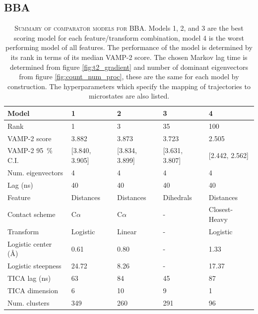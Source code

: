 \documentclass{article}
\begin{document}
\clearpage
\subsection{BBA}

\begin{table}[h]
    \centering
    \begin{tabular}{lllll}
    \toprule
    Model &               1 &               2 &               3 &               4 \\
    \midrule
    Rank                             &               1 &               3 &              35 &             100 \\
    VAMP-2 score                     &           3.882 &           3.873 &           3.723 &           2.505 \\
    VAMP-2 \SI{95}{\percent} C.I.    &  [3.840, 3.905] &  [3.834, 3.899] &  [3.631, 3.807] &  [2.442, 2.562] \\
    Num. eigenvectors                &               4 &               4 &               4 &               4 \\
    Lag (ns)                         &              40 &              40 &              40 &              40 \\
    Feature                          &       Distances &       Distances &       Dihedrals &       Distances \\
    Contact scheme                   &       C$\alpha$ &       C$\alpha$ &               - &   Closest-Heavy \\
    Transform                        &        Logistic &          Linear &               - &        Logistic \\
    Logistic center (\si{\angstrom}) &            0.61 &            0.80 &               - &            1.33 \\
    Logistic steepness               &           24.72 &            8.26 &               - &           17.37 \\
    TICA lag (ns)                    &              63 &              84 &              45 &              87 \\
    TICA dimension                   &               6 &              10 &               9 &               1 \\
    Num. clusters                    &             349 &             260 &             291 &              96 \\
    \bottomrule
    \end{tabular}
    \caption{\textsc{Summary of comparator models for BBA.} Models 1, 2, and 3 are the best scoring model for each feature/transform combination, model 4 is the worst performing model of all features.  The performance of the model is determined by its rank in terms of its median VAMP-2 score.  The chosen Markov lag time is determined from figure \ref{fig:t2_gradient} and number of dominant eigenvectors from figure \ref{fig:count_num_proc}, these are the same for each model by construction. The hyperparameters which specify the mapping of trajectories to microstates are also listed.}
    \label{tab:1fme_mod_defs}
\end{table}
\end{document}
